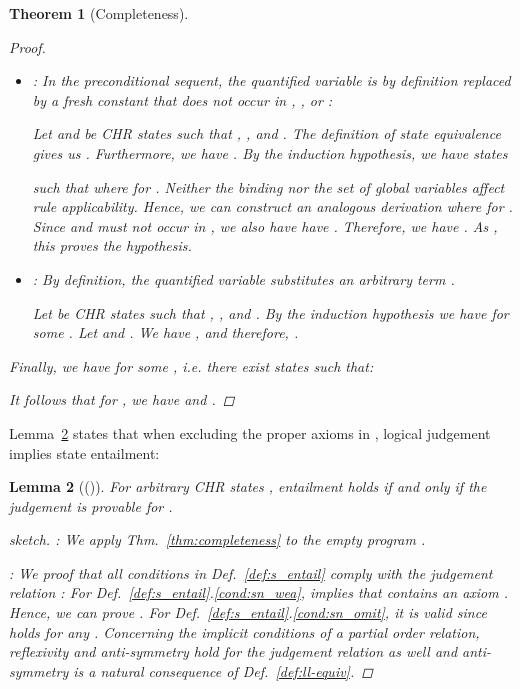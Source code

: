 \documentclass[acmtocl]{acmtrans2m}
\newtheorem{theorem}{Theorem}[section]
\newtheorem{lemma}[theorem]{Lemma}
\begin{document}
\begin{theorem}[Completeness]
\begin{proof}
\begin{itemize}
	  \item : In the preconditional sequent, the quantified
	  variable  is by definition replaced by a
	  fresh constant  that does not occur in , , or
	  :
	  
	  Let  and  be CHR
	  states such that
	  , , and
	  . The
	  definition of state equivalence gives us . Furthermore, we have .
By the induction hypothesis, we have states
	  
	  such that  where
	   for .
Neither the binding  nor the set of global variables affect rule
	applicability. Hence, we can construct an analogous derivation
	 where
	 for . Since  and 
	must not occur in , we also have have .
Therefore, we have . As
	  , this proves the
hypothesis.

	  \item : By definition, the quantified variable 
	  substitutes an
	  arbitrary term .
		
	  Let  be CHR states such that ,
	  , and . By the
	  induction
	  hypothesis we have  for some . Let
	   and .
	  We have
	,
	and therefore, .
	\end{itemize}
	Finally, we have  for some , i.e. there exist states
	 such that:
	
	It follows that for , we have  and .
\end{proof}
\end{theorem}

Lemma~\ref{lemma:judge-entail} states that when excluding the proper axioms in
, logical judgement implies state entailment:

\begin{lemma}[()]
\label{lemma:judge-entail}
   For arbitrary CHR states , entailment  holds \emph{if and only
   if} the judgement  is provable for
   . \begin{proof}[sketch] \noindent : We
   apply Thm.~\ref{thm:completeness} to the empty program .

\noindent : We proof that all conditions in
Def.~\ref{def:s_entail} comply with the judgement relation : For
Def.~\ref{def:s_entail}.\ref{cond:sn_wea}, 
implies that  contains an axiom . Hence, we can prove
. For
Def.~\ref{def:s_entail}.\ref{cond:sn_omit}, it is valid since  holds for any . Concerning the implicit conditions of a partial order
relation, reflexivity and anti-symmetry hold for the judgement relation 
as well and anti-symmetry is a natural consequence of Def.~\ref{def:ll-equiv}.
\end{proof}
\end{lemma}
\end{document}
